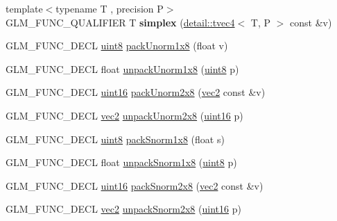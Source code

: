 \begin{DoxyCompactItemize}
\item 
{\footnotesize template$<$typename T , precision P$>$ }\\G\+L\+M\+\_\+\+F\+U\+N\+C\+\_\+\+Q\+U\+A\+L\+I\+F\+I\+ER T {\bfseries simplex} (\hyperlink{structglm_1_1detail_1_1tvec4}{detail\+::tvec4}$<$ T, P $>$ const \&v)\hypertarget{namespaceglm_aadad60578e53c3af96e0a078cc4ad462}{}\label{namespaceglm_aadad60578e53c3af96e0a078cc4ad462}

\item 
G\+L\+M\+\_\+\+F\+U\+N\+C\+\_\+\+D\+E\+CL \hyperlink{group__gtc__type__precision_ga1a7dcd8aac97cc8020817c94049deff2}{uint8} \hyperlink{group__gtc__packing_ga2f9963e5d762b10085b280d3662017ba}{pack\+Unorm1x8} (float v)
\item 
G\+L\+M\+\_\+\+F\+U\+N\+C\+\_\+\+D\+E\+CL float \hyperlink{group__gtc__packing_ga32f3f2642df2ea87449d59fb614a8305}{unpack\+Unorm1x8} (\hyperlink{group__gtc__type__precision_ga1a7dcd8aac97cc8020817c94049deff2}{uint8} p)
\item 
G\+L\+M\+\_\+\+F\+U\+N\+C\+\_\+\+D\+E\+CL \hyperlink{group__gtc__type__precision_gad8c2939e1fdd8e5828b31d95c52255d5}{uint16} \hyperlink{group__gtc__packing_ga833288fc0d4a79f19d0db75a6843bfe6}{pack\+Unorm2x8} (\hyperlink{group__core__types_gaa1618f51db67eaa145db101d8c8431d8}{vec2} const \&v)
\item 
G\+L\+M\+\_\+\+F\+U\+N\+C\+\_\+\+D\+E\+CL \hyperlink{group__core__types_gaa1618f51db67eaa145db101d8c8431d8}{vec2} \hyperlink{group__gtc__packing_ga96ce0c24339ee676e28a027fffd1edf6}{unpack\+Unorm2x8} (\hyperlink{group__gtc__type__precision_gad8c2939e1fdd8e5828b31d95c52255d5}{uint16} p)
\item 
G\+L\+M\+\_\+\+F\+U\+N\+C\+\_\+\+D\+E\+CL \hyperlink{group__gtc__type__precision_ga1a7dcd8aac97cc8020817c94049deff2}{uint8} \hyperlink{group__gtc__packing_ga26b6cd7a35c46c4b6a342f3b97b47423}{pack\+Snorm1x8} (float s)
\item 
G\+L\+M\+\_\+\+F\+U\+N\+C\+\_\+\+D\+E\+CL float \hyperlink{group__gtc__packing_ga6f2bebf536fbf7c8b97d4b306bb3354e}{unpack\+Snorm1x8} (\hyperlink{group__gtc__type__precision_ga1a7dcd8aac97cc8020817c94049deff2}{uint8} p)
\item 
G\+L\+M\+\_\+\+F\+U\+N\+C\+\_\+\+D\+E\+CL \hyperlink{group__gtc__type__precision_gad8c2939e1fdd8e5828b31d95c52255d5}{uint16} \hyperlink{group__gtc__packing_ga05d08a82923166ec7cd5d0e6154c9953}{pack\+Snorm2x8} (\hyperlink{group__core__types_gaa1618f51db67eaa145db101d8c8431d8}{vec2} const \&v)
\item 
G\+L\+M\+\_\+\+F\+U\+N\+C\+\_\+\+D\+E\+CL \hyperlink{group__core__types_gaa1618f51db67eaa145db101d8c8431d8}{vec2} \hyperlink{group__gtc__packing_ga27f30f0281b88e152b0895f5e2ead878}{unpack\+Snorm2x8} (\hyperlink{group__gtc__type__precision_gad8c2939e1fdd8e5828b31d95c52255d5}{uint16} p)

\end{DoxyCompactItemize}
